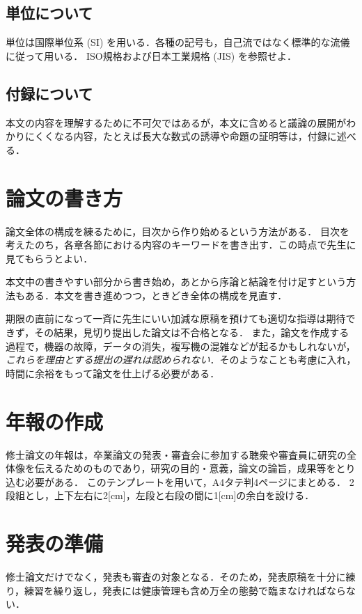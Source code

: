 \documentclass[10pt,a4paper,notitlepage,oneside,twocolumn]{abst_ltjsarticle}
\begin{document}
\subsection{単位について} \label{subsec:section24}
単位は国際単位系 (SI) を用いる．各種の記号も，自己流ではなく標準的な流儀に従って用いる．
ISO規格および日本工業規格 (JIS) を参照せよ．

\subsection{付録について}

本文の内容を理解するために不可欠ではあるが，本文に含めると議論の展開がわかりにくくなる内容，たとえば長大な数式の誘導や命題の証明等は，付録に述べる．


\section{論文の書き方}

論文全体の構成を練るために，目次から作り始めるという方法がある．
目次を考えたのち，各章各節における内容のキーワードを書き出す．この時点で先生に見てもらうとよい．

本文中の書きやすい部分から書き始め，あとから序論と結論を付け足すという方法もある．本文を書き進めつつ，ときどき全体の構成を見直す．

期限の直前になって一斉に先生にいい加減な原稿を預けても適切な指導は期待できず，その結果，見切り提出した論文は不合格となる．
また，論文を作成する過程で，機器の故障，データの消失，複写機の混雑などが起るかもしれないが，
{\em これらを理由とする提出の遅れは認められない}．そのようなことも考慮に入れ，時間に余裕をもって論文を仕上げる必要がある．


\section{年報の作成}

修士論文の年報は，卒業論文の発表・審査会に参加する聴衆や審査員に研究の全体像を伝えるためのものであり，研究の目的・意義，論文の論旨，成果等をとり込む必要がある．
このテンプレートを用いて，A4タテ判4ページにまとめる．
2段組とし，上下左右に2[cm]，左段と右段の間に1[cm]の余白を設ける．



\section{発表の準備}

修士論文だけでなく，発表も審査の対象となる．そのため，発表原稿を十分に練り，練習を繰り返し，発表には健康管理も含め万全の態勢で臨まなければならない．
\end{document}
